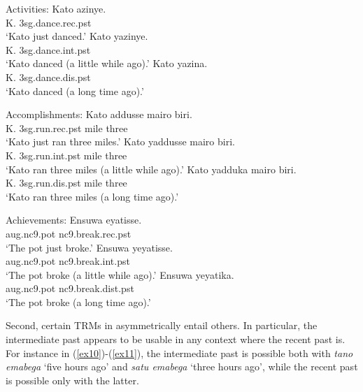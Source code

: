 \documentclass[output=paper,
modfonts
]{langscibook}
\begin{document}
\ea\label{act} Activities:
  \ea\label{act-rec}
  \gll Kato azinye.\\
  K. {\sc3sg}.dance.{\sc rec.pst}\\
  \glt `Kato just danced.'
  \ex\label{act-int}
  \gll Kato yazinye.\\
  K. {\sc3sg}.dance.{\sc int.pst}\\
  \glt `Kato danced (a little while ago).'
  \ex\label{act-dis}
  \gll Kato yazina.\\
  K. {\sc3sg}.dance.{\sc dis.pst}\\
  \glt `Kato danced (a long time ago).'
  \z
\z

\ea\label{acc} Accomplishments:
  \ea\label{acc-rec}
  \gll Kato addusse mairo biri.\\
  K. {\sc3sg}.run.{\sc rec.pst} mile three\\
  \glt `Kato just ran three miles.'
  \ex\label{acc-int}
  \gll Kato yaddusse mairo biri.\\
  K. {\sc3sg}.run.{\sc int.pst} mile three\\
  \glt `Kato ran three miles (a little while ago).'
  \ex\label{acc-dis}
  \gll Kato yadduka mairo biri.\\
  K. {\sc3sg}.run.{\sc dis.pst} mile three\\
  \glt `Kato ran three miles (a long time ago).'
  \z
\z


\ea\label{ach} Achievements:
  \ea\label{ach-rec}
  \gll Ensuwa eyatisse.\\
  {\sc aug}.{\sc nc9}.pot {\sc nc9}.break.{\sc rec.pst}\\
  \glt `The pot just broke.'
  \ex\label{ach-int}
  \gll Ensuwa yeyatisse.\\
  {\sc aug}.{\sc nc9}.pot {\sc nc9}.break.{\sc int.pst}\\
  \glt `The pot broke (a little while ago).'
  \ex\label{ach-dis}
  \gll Ensuwa yeyatika.\\
  {\sc aug}.{\sc nc9}.pot {\sc nc9}.break.{\sc dist.pst}\\
  \glt `The pot broke (a long time ago).'
  \z
\z




Second, certain TRMs in  asymmetrically entail others. In particular, the intermediate past appears to be usable in any context where the recent past is. For instance in (\ref{ex10})-(\ref{ex11}), the intermediate past is possible both with {\it tano emabega} `five hours ago' and {\it satu emabega} `three hours ago', while the recent past is possible only with the latter.
\end{document}
